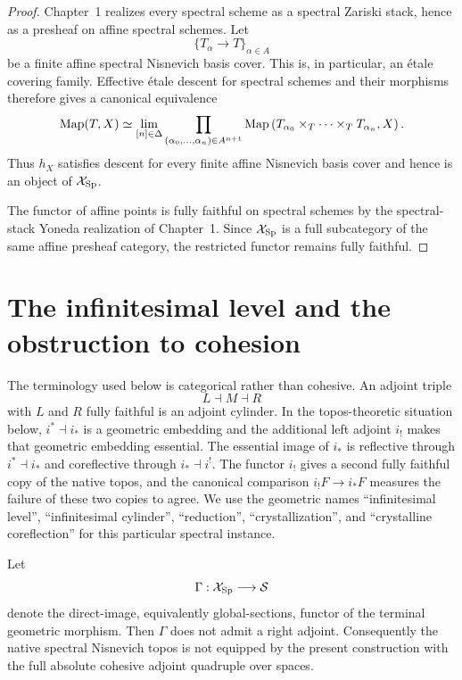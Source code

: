 \begin{proof}
Chapter~1 realizes every spectral scheme as a spectral Zariski stack, hence
as a presheaf on affine spectral schemes.  Let
\[
    \{T_\alpha\longrightarrow T\}_{\alpha\in A}
\]
be a finite affine spectral Nisnevich basis cover.  This is, in particular,
an \'etale covering family.  Effective \'etale descent for spectral schemes
and their morphisms therefore gives a canonical equivalence
\[
    \operatorname{Map}(T,X)
    \simeq
    \operatorname*{lim}_{[n]\in\Delta}
    \prod_{(\alpha_0,\ldots,\alpha_n)\in A^{n+1}}
    \operatorname{Map}
    \left(
      T_{\alpha_0}\times_T\cdots\times_TT_{\alpha_n},
      X
    \right).
\]
Thus $h_X$ satisfies descent for every finite affine Nisnevich basis cover and
hence is an object of $\mathcal X_{\mathrm{Sp}}$.

The functor of affine points is fully faithful on spectral schemes by the
spectral-stack Yoneda realization of Chapter~1.  Since
$\mathcal X_{\mathrm{Sp}}$ is a full subcategory of the same affine presheaf category,
the restricted functor remains fully faithful.
\end{proof}

\section{The infinitesimal level and the obstruction to cohesion}
\label{sec:infinitesimal-level-terminology}

The terminology used below is categorical rather than cohesive.  An adjoint
triple
\[
    L\dashv M\dashv R
\]
with $L$ and $R$ fully faithful is an adjoint cylinder.  In the topos-theoretic
situation below, $i^*\dashv i_*$ is a geometric embedding and the additional
left adjoint $i_!$ makes that geometric embedding essential.  The essential
image of $i_*$ is reflective through $i^*\dashv i_*$ and coreflective through
$i_*\dashv i^!$.  The functor $i_!$ gives a second fully faithful copy of the
native topos, and the canonical comparison $i_!F\to i_*F$ measures the failure
of these two copies to agree.  We use the geometric names ``infinitesimal
level'', ``infinitesimal cylinder'', ``reduction'', ``crystallization'', and
``crystalline coreflection'' for this particular spectral instance.

\begin{proposition}
\label{prop:infinitesimal-absolute-obstruction}
Let
\[
    \Gamma:\mathcal X_{\mathrm{Sp}}\longrightarrow\mathcal S
\]
denote the direct-image, equivalently global-sections, functor of the terminal
geometric morphism.  Then $\Gamma$ does not admit a right adjoint.
Consequently the native spectral Nisnevich topos is not equipped by the
present construction with the full absolute cohesive adjoint quadruple over
spaces.
\end{proposition}

